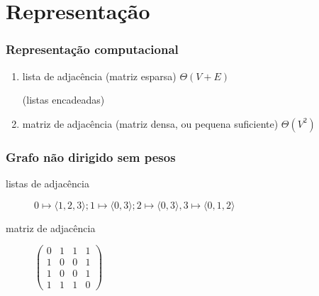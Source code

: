 \documentclass{beamer}
\begin{document}
\section{Representação}

\begin{frame}

\frametitle{Representação computacional}

\begin{enumerate}

\item lista de adjacência (matriz esparsa) $\Theta(V+E)$

  (listas encadeadas)

\item matriz de adjacência (matriz densa, ou pequena suficiente) $\Theta(V^2)$

\end{enumerate}

\end{frame}

\begin{frame}

\frametitle{Grafo não dirigido sem pesos}

\begin{center}
\end{center}

\begin{description}

\item[listas de adjacência] $0 \mapsto \langle 1, 2, 3 \rangle; 1 \mapsto \langle 0, 3 \rangle;
2 \mapsto \langle 0, 3 \rangle, 3 \mapsto \langle 0, 1, 2\rangle$

\item[matriz de adjacência] $\left( 
\begin{array}{cccc}
0 & 1 & 1 & 1 \\
1 & 0 & 0 & 1 \\
1 & 0 & 0 & 1 \\
1 & 1 & 1 & 0
\end{array}
\right)
$
\end{description}
\end{frame}
\end{document}
